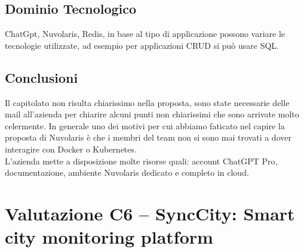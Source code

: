 \documentclass[a4paper, twoside]{article}
\begin{document}
        \subsection{Dominio Tecnologico}
        ChatGpt, Nuvolaris, Redis, in base al tipo di applicazione possono
        variare le tecnologie utilizzate, ad esempio per applicazioni CRUD
        si può usare SQL.

        \subsection{Conclusioni}
        Il capitolato non risulta chiarissimo nella proposta, sono state necessarie
        delle mail all'azienda per chiarire alcuni punti non chiarissimi che sono
        arrivate molto celermente. In generale uno dei motivi per cui abbiamo
        faticato nel capire la proposta di Nuvolaris è che i membri del team non
        si sono mai trovati a dover interagire con Docker o Kubernetes.\\
        L'azienda mette a disposizione molte risorse quali: account ChatGPT Pro,
        documentazione, ambiente Nuvolaris dedicato e completo in cloud.

\section{Valutazione C6 -- SyncCity: Smart city monitoring platform}
\end{document}
